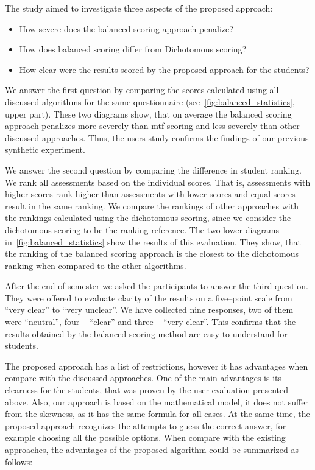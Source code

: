 \documentclass[PhD, Submit, ngerman,UKenglish,table]{scrbook}
\begin{document}
The study aimed to investigate three aspects of the proposed approach:

\begin{itemize}
  \item How severe does the balanced scoring approach penalize?
  \item How does balanced scoring differ from Dichotomous scoring?
  \item How clear were the results scored by the proposed approach for the students?
\end{itemize}

We answer the first question by comparing the scores calculated using all discussed algorithms for the same questionnaire (see~\autoref{fig:balanced_statistics}, upper part).
These two diagrams show, that on average the balanced scoring approach penalizes more severely than \gls{mtf} scoring and less severely than other discussed approaches.
Thus, the users study confirms the findings of our previous synthetic experiment.

We answer the second question by comparing the difference in student ranking.
We rank all assessments based on the individual scores.
That is, assessments with higher scores rank higher than assessments with lower scores and equal scores result in the same ranking.
We compare the rankings of other approaches with the rankings calculated using the dichotomous scoring, since we consider the dichotomous scoring to be the ranking reference.
The two lower diagrams in~\autoref{fig:balanced_statistics} show the results of this evaluation.
They show, that the ranking of the balanced scoring approach is the closest to the dichotomous ranking when compared to the other algorithms.

After the end of semester we asked the participants to answer the third question. 
They were offered to evaluate clarity of the results on a five--point scale from ``very clear'' to ``very unclear''.
We have collected nine responses, two of them were ``neutral'', four -- ``clear'' and three -- ``very clear''.
This confirms that the results obtained by the balanced scoring method are easy to understand for students.

The proposed approach has a list of restrictions, however it has advantages when compare with the discussed approaches.
One of the main advantages is its clearness for the students, that was proven by the user evaluation presented above.
Also, our approach is based on the mathematical model, it does not suffer from the skewness, as it has the same formula for all cases.
At the same time, the proposed approach recognizes the attempts to guess the correct answer, for example choosing all the possible options.
When compare with the existing approaches, the advantages of the proposed algorithm could be summarized as follows:
\end{document}
